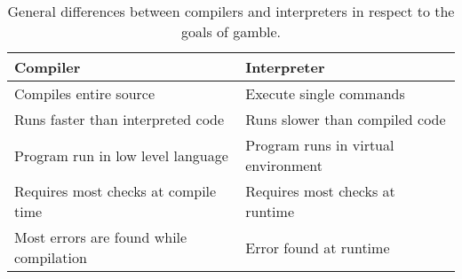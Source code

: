 \begin{table}[h]
    \centering
    \begin{tabular}{|l|l|}
    \hline
    \textbf{Compiler}                           & \textbf{Interpreter}           \\ \hline
    Compiles entire source                      & Execute single commands         \\ \hline 
    Runs faster than interpreted code           & Runs slower than compiled code \\ \hline
    Program run in low level language           & Program runs in virtual environment      \\ \hline
    Requires most checks at compile time        & Requires most checks at runtime      \\ \hline
    Most errors are found while compilation     & Error found at runtime \\ \hline 
    \end{tabular} 
    \caption{General differences between compilers and interpreters in respect to the goals of \gls{gamble}.}
    \label{tbl:compint}
\end{table}
